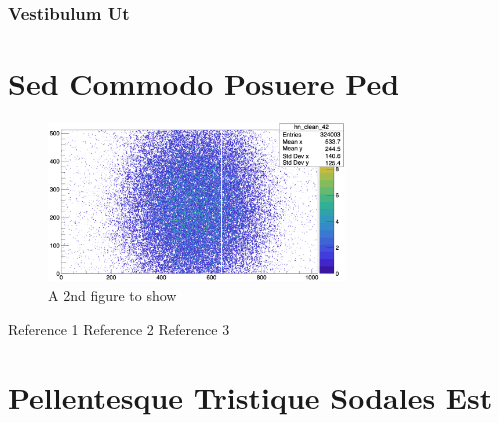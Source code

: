 \documentclass[doctor, english]{pnuthesis}
\begin{document}
\subsection{Vestibulum Ut}
\lipsum[7]

\chapter{Sed Commodo Posuere Ped}
\lipsum[8-9]
\begin{figure}[!h]
	\centering
	\includegraphics[width=0.7\textwidth]{figure/samplefig2.png}
	\caption{A 2nd figure to show}
\end{figure}
\lipsum[9-10]

%
%

\begin{thebibliography}{00}
	 Reference 1
	 Reference 2
	 Reference 3
\end{thebibliography}


\appendix
\chapter{Pellentesque Tristique Sodales Est}
\lipsum[12-14]

\pagebreak
\acknowledgement %

\lipsum[1-7]
\end{document}
